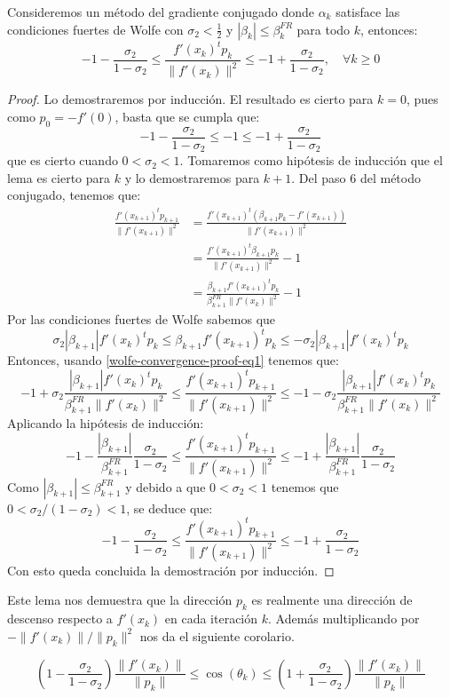 \begin{lemma}
	Consideremos un método del gradiente conjugado donde $\alpha_k$ satisface las condiciones fuertes de Wolfe con $\sigma_2<\frac{1}{2}$ y $|\beta_k| \leq \beta_k^{FR}$ para todo $k$, entonces:
	\[
		-1- \frac{\sigma_2}{1-\sigma_2} \leq \frac{f'(x_k)^t p_k}{\|f'(x_k)\|^2} \leq -1+\frac{\sigma_2}{1-\sigma_2}, \quad \forall k\geq 0
	\]
\begin{proof}
	Lo demostraremos por inducción. El resultado es cierto para $k=0$, pues como $p_0=-f'(0)$, basta que se cumpla que:
	\[ -1- \frac{\sigma_2}{1-\sigma_2} \leq -1 \leq -1+\frac{\sigma_2}{1-\sigma_2} \]
	que es cierto cuando $0<\sigma_2<1$. Tomaremos como hipótesis de inducción que el lema es cierto para $k$ y lo demostraremos para $k+1$. Del paso 6 del método conjugado, tenemos que:
	\begin{align}
		\frac{f'(x_{k+1})^t p_{k+1}}{\|f'(x_{k+1})\|^2} &= \frac{f'(x_{k+1})^t (\beta_{k+1}p_k - f'(x_{k+1}))}{\|f'(x_{k+1})\|^2}\nonumber\\
		&= \frac{f'(x_{k+1})^t \beta_{k+1}p_k}{\|f'(x_{k+1})\|^2}-1\nonumber\\
		&= \frac{\beta_{k+1}f'(x_{k+1})^tp_k}{\beta_{k+1}^{FR} \|f'(x_k)\|^2} - 1\label{wolfe-convergence-proof-eq1}
	\end{align}
	Por las condiciones fuertes de Wolfe sabemos que
	\[ \sigma_2 |\beta_{k+1}|f'(x_k)^tp_k\leq \beta_{k+1} f'(x_{k+1})^t p_k \leq - \sigma_2 |\beta_{k+1}|f'(x_k)^tp_k\]
	Entonces, usando \eqref{wolfe-convergence-proof-eq1} tenemos que:
	\[ -1+\sigma_2 \frac{|\beta_{k+1}|f'(x_k)^tp_k}{\beta_{k+1}^{FR}\|f'(x_k)\|^2}\leq \frac{f'(x_{k+1})^t p_{k+1}}{\|f'(x_{k+1})\|^2} \leq -1 - \sigma_2 \frac{|\beta_{k+1}|f'(x_k)^tp_k}{\beta_{k+1}^{FR}\|f'(x_k)\|^2}\]
	Aplicando la hipótesis de inducción:
	\[ -1- \frac{|\beta_{k+1}|}{\beta_{k+1}^{FR}} \frac{\sigma_2}{1-\sigma_2} \leq \frac{f'(x_{k+1})^t p_{k+1}}{\|f'(x_{k+1})\|^2} \leq -1+ \frac{|\beta_{k+1}|}{\beta_{k+1}^{FR}} \frac{\sigma_2}{1-\sigma_2}\]
	Como $|\beta_{k+1}|\leq \beta_{k+1}^{FR}$ y debido a que $0<\sigma_2<1$ tenemos que $0<\sigma_2/(1-\sigma_2)<1$, se deduce que:
	\[
	-1- \frac{\sigma_2}{1-\sigma_2} \leq \frac{f'(x_{k+1})^t p_{k+1}}{\|f'(x_{k+1})\|^2} \leq -1+\frac{\sigma_2}{1-\sigma_2}
	\]
	Con esto queda concluida la demostración por inducción.
\end{proof}
\end{lemma}
Este lema nos demuestra que la dirección $p_k$ es realmente una dirección de descenso respecto a $f'(x_k)$ en cada iteración $k$. Además multiplicando por $-\|f'(x_k)\|/\|p_k\|^2$ nos da el siguiente corolario.
\begin{corollary}\label{zoutedijk-corol}
	\[
	\left(1-\frac{\sigma_2}{1-\sigma_2}\right)\frac{\|f'(x_k)\|}{\|p_k\|} \leq \cos(\theta_k) \leq \left(1+\frac{\sigma_2}{1-\sigma_2}\right)\frac{\|f'(x_k)\|}{\|p_k\|}
	\]
\end{corollary}

